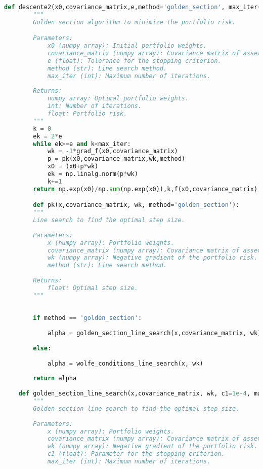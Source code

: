 \documentclass[12pt]{article}
\begin{document}
\begin{lstlisting}[language=Python]
    def descente2(x0,covariance_matrix,e,method='golden_section', max_iter=10000):
        """
        Golden section algorithm to minimize the portfolio risk.

        Parameters:
            x0 (numpy array): Initial portfolio weights.
            covariance_matrix (numpy array): Covariance matrix of asset returns.
            e (float): Tolerance for the stopping criterion.
            method (str): Line search method.
            max_iter (int): Maximum number of iterations.
            
        Returns:
            numpy array: Optimal portfolio weights.
            int: Number of iterations.
            float: Portfolio risk.
        """
        k = 0
        ek = 2*e
        while ek>=e and k<max_iter:
            wk = -1*grad_f(x0,covariance_matrix)
            p = pk(x0,covariance_matrix,wk,method)
            x0 = (x0+p*wk)
            ek = np.linalg.norm(p*wk)
            k+=1
        return np.exp(x0)/np.sum(np.exp(x0)),k,f(x0,covariance_matrix)

        def pk(x,covariance_matrix, wk, method='golden_section'):
        """
        Line search to find the optimal step size.
    
        Parameters:
            x (numpy array): Portfolio weights.
            covariance_matrix (numpy array): Covariance matrix of asset returns.
            wk (numpy array): Negative gradient of the portfolio risk.
            method (str): Line search method.
    
        Returns:
            float: Optimal step size.
        """
    
    
        if method == 'golden_section':
    
            alpha = golden_section_line_search(x,covariance_matrix, wk)
    
        else:
    
            alpha = wolfe_conditions_line_search(x, wk)
    
        return alpha
    
    def golden_section_line_search(x,covariance_matrix, wk, c1=1e-4, max_iter=100):
        """
        Golden section line search to find the optimal step size.
        
        Parameters:
            x (numpy array): Portfolio weights.
            covariance_matrix (numpy array): Covariance matrix of asset returns.
            wk (numpy array): Negative gradient of the portfolio risk.
            c1 (float): Parameter for the stopping criterion.
            max_iter (int): Maximum number of iterations.
            

\end{lstlisting}
\end{document}
